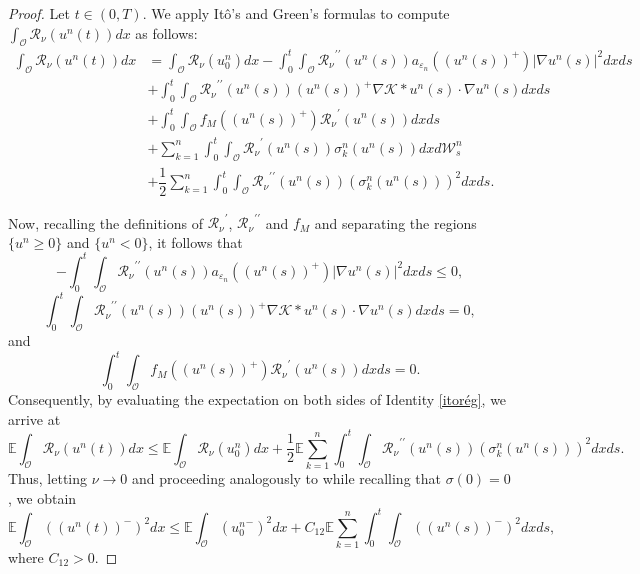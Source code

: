 \documentclass[10pt,number,preprint,times]{elsarticle}
\numberwithin{equation}{section} %
\begin{document}
\begin{proof}
\noindent
Let $t\in (0,T)$. We apply Itô's and Green's formulas to compute $\displaystyle \int_\mathcal{O} \mathcal{R}_{\nu}\left(u^n(t)\right) dx$ as follows:
\begin{align}\label{itorég}
\int_\mathcal{O} \mathcal{R}_{\nu}\left(u^n(t)\right) dx&=\int_\mathcal{O} \mathcal{R}_{\nu}\left(u^n_0\right) dx \nonumber-\int_0^t \int_\mathcal{O} {\mathcal{R}_\nu}^{\prime \prime}(u^n(s)) a_{\varepsilon_n}(\left(u^n(s)\right)^+) \vert \nabla u^n(s) \vert^2 dx ds \nonumber\\
&+\int_0^t \int_\mathcal{O} {\mathcal{R}_\nu}^{\prime \prime}(u^n(s)) \left(u^n(s)\right)^+\nabla \mathcal{K} \ast u^n(s) \cdot \nabla u^n(s)dxds \nonumber\\
&+\int_0^t \int_{\mathcal{O}} f_M((u^n(s))^+) {\mathcal{R}_\nu}^{\prime}(u^n(s))dx ds\nonumber\\
&+\sum_{k=1}^{n} \int_{0}^t \int_{\mathcal{O}} {\mathcal{R}_\nu}^{\prime}(u^n(s)) \sigma_{k}^n(u^n(s)) dx d\mathcal{W}^n_s\nonumber \\
&+\dfrac{1}{2} \sum_{k=1}^{n} \int_{0}^{t} \int_{\mathcal{O}} {\mathcal{R}_\nu}^{\prime \prime}(u^n(s))  \left(\sigma_{k}^n(u^n(s))\right)^2 dx ds.
\end{align}

\noindent
Now, recalling the definitions of ${\mathcal{R}_\nu}^{\prime}$, ${\mathcal{R}_\nu}^{\prime \prime}$ and $f_M$ and separating the regions $\{u^n \geq 0\}$ and $\{u^n<0\}$,  it follows that
$$-\int_0^t \int_\mathcal{O} {\mathcal{R}_\nu}^{\prime \prime}(u^n(s)) a_{\varepsilon_n}(\left(u^n(s)\right)^+) \vert \nabla u^n(s) \vert^2 dx ds\leq  0,$$
$$\int_0^t \int_\mathcal{O} {\mathcal{R}_\nu}^{\prime \prime}(u^n(s)) \left(u^n(s)\right)^+\nabla \mathcal{K} \ast u^n(s) \cdot \nabla u^n(s)dxds=0,$$
and 
$$\int_0^t \int_{\mathcal{O}} f_M((u^n(s))^+) {\mathcal{R}_\nu}^{\prime}(u^n(s))dxds=0.$$
Consequently, by evaluating the expectation on both sides of Identity \eqref{itorég}, we arrive at
\begin{equation}\label{itorgconsq}
	\mathbb{E} \int_\mathcal{O} \mathcal{R}_{\nu}\left(u^n(t)\right) dx\leq \mathbb{E} \int_\mathcal{O} \mathcal{R}_{\nu}\left(u^n_0\right) dx \nonumber+\dfrac{1}{2} \mathbb{E} \sum_{k=1}^{n} \int_{0}^{t} \int_{\mathcal{O}} {\mathcal{R}_\nu}^{\prime \prime}(u^n(s))  \left(\sigma_{k}^n(u^n(s))\right)^2 dx ds.
\end{equation}
Thus, letting $\nu \rightarrow 0$ and proceeding analogously to \cite[Section 3.2]{chekroun2016stampacchia} while recalling that $\sigma(0)=0$, we obtain
\begin{equation}\label{itorgconsqlim}
	\mathbb{E} \int_\mathcal{O}\left( \left(u^n(t)\right)^-\right)^2 dx\leq \mathbb{E} \int_\mathcal{O} \left({u^n_0}^-\right)^2dx \nonumber+C_{12} \mathbb{E} \sum_{k=1}^{n} \int_{0}^{t} \int_{\mathcal{O}} \left(\left(u^n(s)\right)^-\right)^2  dx ds,
\end{equation}
where $C_{12}>0$.


\end{proof}
\end{document}
